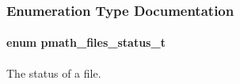 \subsubsection{Enumeration Type Documentation}
\hypertarget{group__file__api_g1fa07caf59a04495b7c74be6aff3a3d9}{
\paragraph[{pmath\_\-files\_\-status\_\-t}]{\setlength{\rightskip}{0pt plus 5cm}enum {\bf pmath\_\-files\_\-status\_\-t}}\hfill}
\label{group__file__api_g1fa07caf59a04495b7c74be6aff3a3d9}


The status of a file. 

